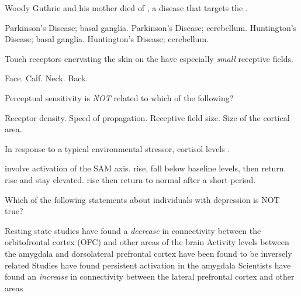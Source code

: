 \documentclass[answers]{exam}
\begin{document}
\begin{questions}
\newpage

\question Woody Guthrie and his mother died of \fillin, a disease that targets the \fillin.
\begin{choices}
\choice Parkinson’s Disease; basal ganglia.
\choice Parkinson’s Disease; cerebellum.
\correctchoice Huntington’s Disease; basal ganglia.
\choice Huntington’s Disease; cerebellum.
\end{choices}

\question Touch receptors enervating the skin on the \fillin have especially \emph{small} receptive fields.
\begin{choices}
\correctchoice Face.
\choice Calf.
\choice Neck.
\choice Back.
\end{choices}

\question Perceptual sensitivity is \emph{NOT} related to which of the following?
\begin{choices}
\choice Receptor density.
\correctchoice Speed of propagation.
\choice Receptive field size.
\choice Size of the cortical area.
\end{choices}

\question In response to a typical environmental stressor, cortisol levels \fillin.
\begin{choices}
\choice involve activation of the SAM axis.
\choice rise, fall below baseline levels, then return.
\choice rise and stay elevated.
\correctchoice rise then return to normal after a short period.
\end{choices}


\question Which of the following statements about individuals with depression is NOT true?
\begin{choices}
\correctchoice Resting state studies have found a \emph{decrease} in connectivity between the orbitofrontal cortex (OFC) and other areas of the brain
\choice Activity levels between the amygdala and dorsolateral prefrontal cortex have been found to be inversely related
\choice Studies have found persistent activation in the amygdala
\choice Scientists have found an \emph{increase} in connectivity between the lateral prefrontal cortex and other areas
\end{choices}


\end{questions}
\end{document}
